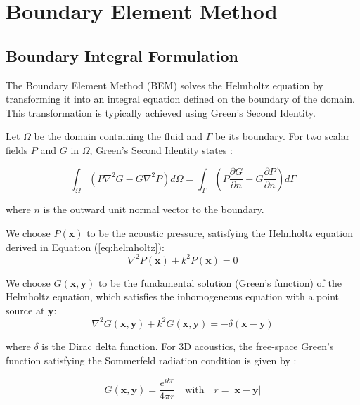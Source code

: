 \section{Boundary Element Method}\label{sec:bem}

\subsection{Boundary Integral Formulation}

The Boundary Element Method (BEM) solves the Helmholtz equation by transforming it into an integral equation defined on the boundary of the domain. This transformation is typically achieved using Green's Second Identity.

Let $\Omega$ be the domain containing the fluid and $\Gamma$ be its boundary. For two scalar fields $P$ and $G$ in $\Omega$, Green's Second Identity states \cite{wu2000boundary}:

\begin{equation}
    \int_{\Omega} \left( P \nabla^2 G - G \nabla^2 P \right) d\Omega = \int_{\Gamma} \left( P \frac{\partial G}{\partial n} - G \frac{\partial P}{\partial n} \right) d\Gamma
\end{equation}

where $n$ is the outward unit normal vector to the boundary.

We choose $P(\mathbf{x})$ to be the acoustic pressure, satisfying the Helmholtz equation derived in Equation (\ref{eq:helmholtz}):
\begin{equation}
    \nabla^2 P(\mathbf{x}) + k^2 P(\mathbf{x}) = 0
\end{equation}

We choose $G(\mathbf{x}, \mathbf{y})$ to be the fundamental solution (Green's function) of the Helmholtz equation, which satisfies the inhomogeneous equation with a point source at $\mathbf{y}$:
\begin{equation}
    \nabla^2 G(\mathbf{x}, \mathbf{y}) + k^2 G(\mathbf{x}, \mathbf{y}) = -\delta(\mathbf{x} - \mathbf{y})
\end{equation}

where $\delta$ is the Dirac delta function. For 3D acoustics, the free-space Green's function satisfying the Sommerfeld radiation condition is given by \cite{kirkup1998boundary}:

\begin{equation}
    G(\mathbf{x}, \mathbf{y}) = \frac{e^{ik r}}{4 \pi r} \quad \mbox{with} \quad r = |\mathbf{x} - \mathbf{y}|
\end{equation}

